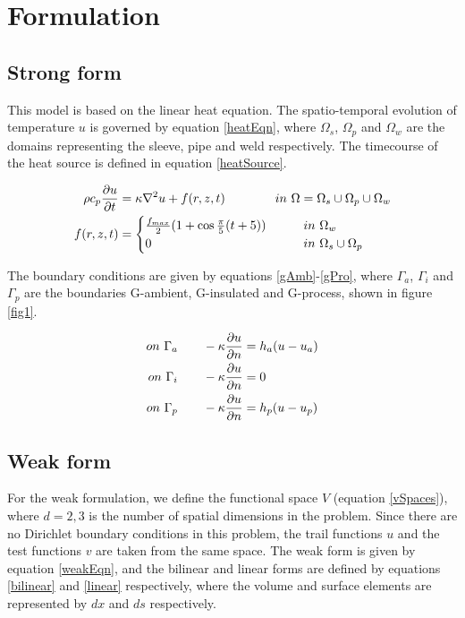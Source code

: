 \documentclass{article}
\begin{document}
\section{Formulation}
\subsection{Strong form}
 This model is based on the linear heat equation. The spatio-temporal evolution of temperature $u$ is governed by equation \ref{heatEqn}, where $\Omega_s$, $\Omega_p$ and $\Omega_w$ are the domains representing the sleeve, pipe and weld respectively. The timecourse of the heat source is defined in equation \ref{heatSource}.
 
\begin{align}
\rho c_p \pdv{u}{t} &= \kappa \laplacian{u} + f(r, z, t) \qquad \qquad in~ \Omega = \Omega_s \cup \Omega_p \cup \Omega_w  \label{heatEqn}   \\
f(r, z, t) &= \begin{cases}
\frac{f_{max}}{2} (1 + \cos{\frac{\pi}{5}(t + 5)}) \qquad & in ~ \Omega_w \\
0  \qquad & in ~  \Omega_s\cup\Omega_p
\end{cases} \label{heatSource}
\end{align}

The boundary conditions are given by equations \ref{gAmb}-\ref{gPro}, where $\Gamma_a$, $\Gamma_i$ and $\Gamma_p$ are the boundaries G-ambient, G-insulated and G-process, shown in figure \ref{fig1}.

\begin{align}
on ~\Gamma_a \qquad -\kappa \pdv{u}{n} &= h_a(u - u_a)\label{gAmb} \\
on ~\Gamma_i \qquad -\kappa \pdv{u}{n} &= 0\label{gIns} \\
on ~\Gamma_p \qquad -\kappa \pdv{u}{n} &= h_p(u - u_p)\label{gPro}
\end{align}

\subsection{Weak form}
 For the weak formulation, we define the functional space $V$ (equation \ref{vSpaces}), where $d = 2,3$ is the number of spatial dimensions in the problem. Since there are no Dirichlet boundary conditions in this problem, the trail functions $u$ and the test functions $v$ are taken from the same space. The weak form is given by equation \ref{weakEqn}, and the bilinear and linear forms are defined by equations \ref{bilinear} and \ref{linear} respectively, where the volume and surface elements are represented by $dx$ and $ds$ respectively. 
\end{document}
